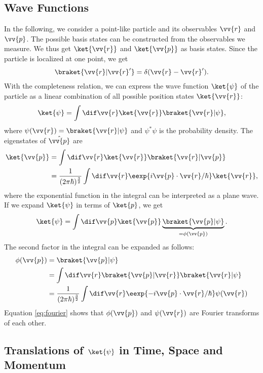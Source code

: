 		\subsection{Wave Functions}
			In the following, we consider a point-like particle and its observables $\vv{r}$ and $\vv{p}$. The possible basis states can be constructed from the observables we measure. We thus get $\ket{\vv{r}}$ and $\ket{\vv{p}}$ as basis states. Since the particle is localized at one point, we get
			\begin{align}
				\braket{\vv{r}|\vv{r}'} =\delta(\vv{r}-\vv{r}').
			\end{align}
			With the completeness relation, we can express the wave function $\ket{\psi}$ of the particle as a linear combination of all possible position states $\ket{\vv{r}}$:
			\begin{align}
				\ket{\psi}=\int \dif \vv{r} \ket{\vv{r}}\braket{\vv{r}|\psi},
			\end{align}
			where $\psi(\vv{r})=\braket{\vv{r}|\psi}$ and $\psi^*\psi$ is the probability density.
			The eigenstates of $\hat{\vv{p}}$ are
			\begin{align}
				\ket{\vv{p}}&=\int \dif \vv{r} \ket{\vv{r}} \braket{\vv{r}|\vv{p}} \\
				&= \frac{1}{(2\pi\hbar)^{\frac{3}{2}}} \int \dif \vv{r} \eexp{{i \vv{p}\cdot\vv{r}}/{\hbar}}\ket{\vv{r}},
			\end{align}
			where the exponential function in the integral can be interpreted as a plane wave.
			If we expand $\ket{\psi}$ in terms of $\ket{p}$, we get
			\begin{align}
				\ket{\psi}=\int \dif \vv{p} \ket{\vv{p}}\underbrace{\braket{\vv{p}|\psi}}_{=\phi(\vv{p})}.
			\end{align}
			The second factor in the integral can be expanded as follows:
			\begin{align}
				\phi(\vv{p})	&=\braket{\vv{p}|\psi}\\
				&=\int\dif\vv{r}\braket{\vv{p}|\vv{r}}\braket{\vv{r}|\psi}\\
				&=\frac{1}{(2\pi\hbar)^{\frac{3}{2}}} \int\dif\vv{r}\eexp{-i\vv{p}\cdot\vv{r}/{\hbar}}\psi(\vv{r}) \label{eq:fourier}
			\end{align}
			Equation \eqref{eq:fourier} shows that $\phi(\vv{p})$ and $\psi(\vv{r})$ are Fourier transforms of each other.

	\subsection{Translations of $\ket{\psi}$ in Time, Space and Momentum}

